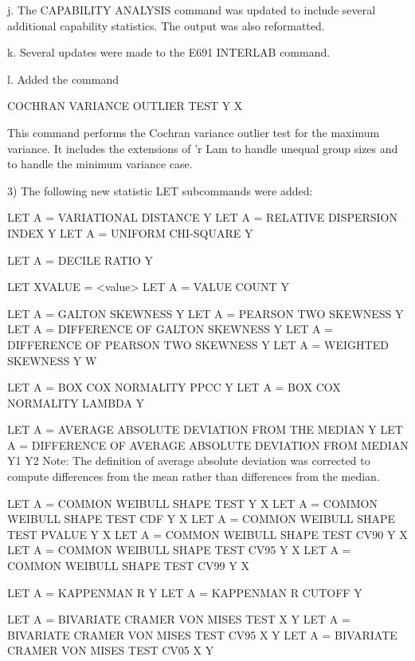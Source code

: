     j. The CAPABILITY ANALYSIS command was updated to include several
       additional capability statistics.  The output was also reformatted.

    k. Several updates were made to the E691 INTERLAB command.

    l. Added the command

           COCHRAN VARIANCE OUTLIER TEST Y X

       This command performs the Cochran variance outlier test for the
       maximum variance.  It includes the extensions of 'r Lam to handle
       unequal group sizes and to handle the minimum variance case.

 3) The following new statistic LET subcommands were added:

          LET A = VARIATIONAL DISTANCE Y
          LET A = RELATIVE DISPERSION INDEX Y
          LET A = UNIFORM CHI-SQUARE Y

          LET A = DECILE RATIO Y

          LET XVALUE = <value>
          LET A = VALUE COUNT Y

          LET A = GALTON SKEWNESS Y
          LET A = PEARSON TWO SKEWNESS Y
          LET A = DIFFERENCE OF GALTON SKEWNESS Y
          LET A = DIFFERENCE OF PEARSON TWO SKEWNESS Y
          LET A = WEIGHTED SKEWNESS Y W

          LET A = BOX COX NORMALITY PPCC Y
          LET A = BOX COX NORMALITY LAMBDA Y

          LET A = AVERAGE ABSOLUTE DEVIATION FROM THE MEDIAN Y
          LET A = DIFFERENCE OF AVERAGE ABSOLUTE DEVIATION FROM MEDIAN Y1 Y2
                  Note: The definition of average absolute deviation
                        was corrected to compute differences from the
                        mean rather than differences from the median.

          LET A = COMMON WEIBULL SHAPE TEST Y X
          LET A = COMMON WEIBULL SHAPE TEST CDF Y X
          LET A = COMMON WEIBULL SHAPE TEST PVALUE Y X
          LET A = COMMON WEIBULL SHAPE TEST CV90 Y X
          LET A = COMMON WEIBULL SHAPE TEST CV95 Y X
          LET A = COMMON WEIBULL SHAPE TEST CV99 Y X

          LET A = KAPPENMAN R Y
          LET A = KAPPENMAN R CUTOFF  Y

          LET A = BIVARIATE CRAMER VON MISES TEST X Y
          LET A = BIVARIATE CRAMER VON MISES TEST CV95 X Y
          LET A = BIVARIATE CRAMER VON MISES TEST CV05 X Y

